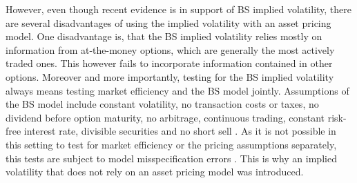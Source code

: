 However, even though recent evidence is in support of \ac{BS} implied volatility, there are several disadvantages of using the implied volatility with an asset pricing model. One disadvantage is, that the \ac{BS} implied volatility relies mostly on information from at-the-money options, which are generally the most actively traded ones. This however fails to incorporate information contained in other options. Moreover and more importantly, testing for the \ac{BS} implied volatility always means testing market efficiency and the \ac{BS} model jointly. Assumptions of the \ac{BS} model include constant volatility, no transaction costs or taxes, no dividend before option maturity, no arbitrage, continuous trading, constant risk-free interest rate, divisible securities and no short sell \parencite{poon2003}. As it is not possible in this setting to test for market efficiency or the pricing assumptions separately, this tests are subject to model misspecification errors \parencite{jiang2003}. This is why an implied volatility that does not rely on an asset pricing model was introduced. 


